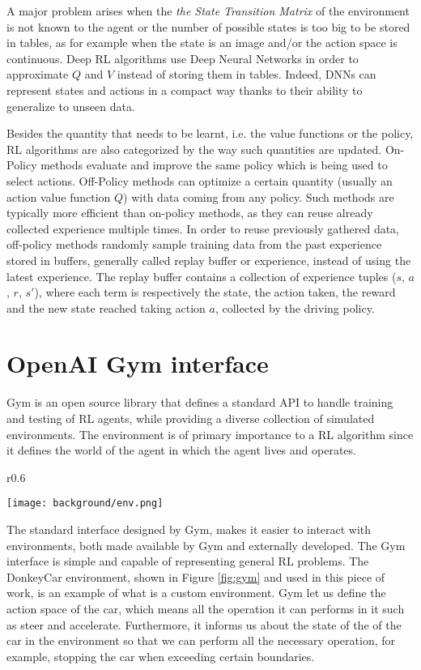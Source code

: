 A major problem arises when the \textit{the State Transition Matrix} of the environment is not known to the agent or the number of possible states is too big to be stored in tables, as for example when the state is an image and/or the action space is continuous. Deep RL algorithms use Deep Neural Networks in order to approximate $Q$ and $V$ instead of storing them in tables. Indeed, DNNs can represent states and actions in a compact way thanks to their ability to generalize to unseen data. 

Besides the quantity that needs to be learnt, i.e. the value functions or the policy, RL algorithms are also categorized by the way such quantities are updated. On-Policy methods evaluate and improve the same policy which is being used to select actions. Off-Policy methods can optimize a certain quantity (usually an action value function $Q$) with data coming from any policy. Such methods are typically more efficient than on-policy methods, as they can reuse already collected experience multiple times. In order to reuse previously gathered data, off-policy methods randomly sample training data from the past experience stored in buffers, generally called replay buffer or experience, instead of using the latest experience. The replay buffer contains a collection of experience tuples ($s$, $a$, $r$, $s'$), where each term is respectively the state, the action taken, the reward and the new state reached taking action $a$, collected by the driving policy.

\section{OpenAI Gym interface}

Gym is an open source library that defines a standard API to handle training and testing of RL agents, while providing a diverse collection of simulated environments. The environment is of primary importance to a RL algorithm since it defines the world of the agent in which the agent lives and operates. 

\begin{wrapfigure}{r}{0.6\textwidth}
  \begin{center}
    \texttt{[image: background/env.png]}
  \end{center}
  \caption{DonkeyCar environment implemented with Gym}
  \label{fig:gym}
\end{wrapfigure}

The standard interface designed by Gym, makes it easier to interact with environments, both made available by Gym and externally developed. The Gym interface is simple and capable of representing general RL problems. The DonkeyCar environment, shown in Figure \ref{fig:gym} and used in this piece of work, is an example of what is a custom environment. Gym let us define the action space of the car, which means all the operation it can performs in it such as steer and accelerate. Furthermore, it informs us about the state of the of the car in the environment so that we can perform all the necessary operation, for example, stopping the car when exceeding certain boundaries. 

